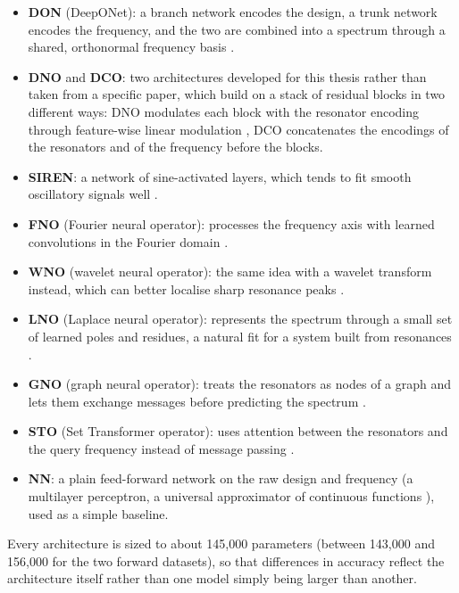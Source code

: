 \begin{itemize}
  \item \textbf{DON} (DeepONet): a branch network encodes the design, a trunk network encodes the frequency, and the two are combined into a spectrum through a shared, orthonormal frequency basis \parencite{lu2021deeponet}.
  \item \textbf{DNO} and \textbf{DCO}: two architectures developed for this thesis rather than taken from a specific paper, which build on a stack of residual blocks \parencite{he2016resnet} in two different ways: DNO modulates each block with the resonator encoding through feature-wise linear modulation \parencite{perez2018film}, DCO concatenates the encodings of the resonators and of the frequency before the blocks.
  \item \textbf{SIREN}: a network of sine-activated layers, which tends to fit smooth oscillatory signals well \parencite{sitzmann2020siren}.
  \item \textbf{FNO} (Fourier neural operator): processes the frequency axis with learned convolutions in the Fourier domain \parencite{li2021fno}.
  \item \textbf{WNO} (wavelet neural operator): the same idea with a wavelet transform instead, which can better localise sharp resonance peaks \parencite{tripura2022wno}.
  \item \textbf{LNO} (Laplace neural operator): represents the spectrum through a small set of learned poles and residues, a natural fit for a system built from resonances \parencite{cao2023lno}.
  \item \textbf{GNO} (graph neural operator): treats the resonators as nodes of a graph and lets them exchange messages before predicting the spectrum \parencite{li2020graphno,gilmer2017mpnn}.
  \item \textbf{STO} (Set Transformer operator): uses attention between the resonators and the query frequency instead of message passing \parencite{lee2019settransformer,vaswani2017attention}.
  \item \textbf{NN}: a plain feed-forward network on the raw design and frequency (a multilayer perceptron, a universal approximator of continuous functions \parencite{hornik1989approximation}), used as a simple baseline.
\end{itemize}

Every architecture is sized to about 145{,}000 parameters (between 143{,}000 and 156{,}000 for the two forward datasets), so that differences in accuracy reflect the architecture itself rather than one model simply being larger than another.

